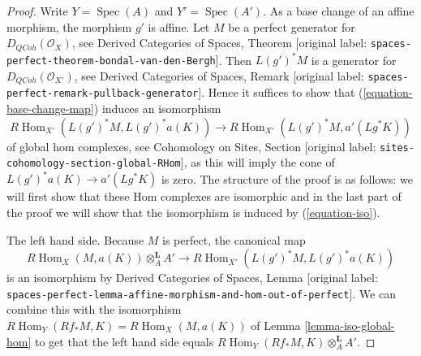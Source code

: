 \documentclass[10pt,a4paper]{article}
\theoremstyle{plain}
\theoremstyle{definition}
\theoremstyle{remark}
\numberwithin{equation}{subsection}
\def\Spec{\mathop{\mathrm{Spec}}}
\def\Hom{\mathop{\mathrm{Hom}}\nolimits}
\def\QCoh{\mathit{QCoh}}
\begin{document}
\begin{proof}
Write $Y = \Spec(A)$ and $Y' = \Spec(A')$. As a base change of an affine
morphism, the morphism $g'$ is affine. Let $M$ be a perfect generator
for $D_\QCoh(\mathcal{O}_X)$, see Derived Categories of Spaces, Theorem
\textnormal{[original label: \nolinkurl{spaces-perfect-theorem-bondal-van-den-Bergh}]}. Then $L(g')^*M$ is a
generator for $D_\QCoh(\mathcal{O}_{X'})$, see
Derived Categories of Spaces, Remark
\textnormal{[original label: \nolinkurl{spaces-perfect-remark-pullback-generator}]}.
Hence it suffices to show that (\ref{equation-base-change-map})
induces an isomorphism
\begin{equation}
\label{equation-iso}
R\Hom_{X'}(L(g')^*M, L(g')^*a(K))
\longrightarrow
R\Hom_{X'}(L(g')^*M, a'(Lg^*K))
\end{equation}
of global hom complexes, see
Cohomology on Sites, Section \textnormal{[original label: \nolinkurl{sites-cohomology-section-global-RHom}]},
as this will imply the cone of $L(g')^*a(K) \to a'(Lg^*K)$
is zero.
The structure of the proof is as follows: we will first show that
these Hom complexes are isomorphic and in the last part of the proof
we will show that the isomorphism is induced by (\ref{equation-iso}).

\medskip\noindent
The left hand side. Because $M$ is perfect, the canonical map
$$
R\Hom_X(M, a(K)) \otimes^\mathbf{L}_A A'
\longrightarrow
R\Hom_{X'}(L(g')^*M, L(g')^*a(K))
$$
is an isomorphism by Derived Categories of Spaces, Lemma
\textnormal{[original label: \nolinkurl{spaces-perfect-lemma-affine-morphism-and-hom-out-of-perfect}]}.
We can combine this with the isomorphism
$R\Hom_Y(Rf_*M, K) = R\Hom_X(M, a(K))$
of Lemma \ref{lemma-iso-global-hom}
to get that the left hand side equals
$R\Hom_Y(Rf_*M, K) \otimes^\mathbf{L}_A A'$.


\end{proof}
\end{document}
